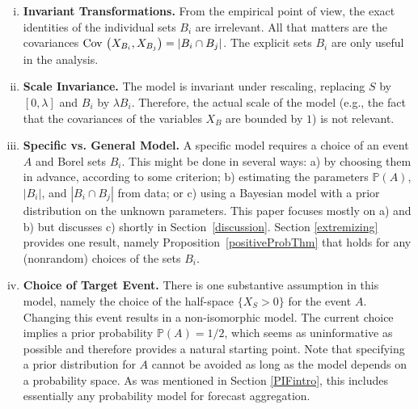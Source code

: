 \documentclass[12pt]{article}
\renewcommand{\P}{\mathbb{P}}
\theoremstyle{definition}
\theoremstyle{definition}
\def\P{{\mathbb P}}
\def\Cov{{\rm Cov}\,}
\begin{document}
\begin{enumerate}[(i)]
\item {\bf Invariant Transformations.}  From the empirical point of
view, the exact identities of the individual sets $B_i$ are
irrelevant.  All that matters are the covariances $\Cov \left(X_{B_i}
, X_{B_j}\right) = |B_i \cap B_j|$.  The explicit sets $B_i$ are only useful in the analysis.

\item {\bf Scale Invariance.} The model is invariant under rescaling,
replacing $S$ by $[0,\lambda]$ and $B_i$ by $\lambda B_i$.  Therefore,
the actual scale of the model (e.g., the fact that the covariances of
the variables $X_B$ are bounded by $1$) is not relevant. \vspace{-0.5em}


\item {\bf Specific vs. General Model.} A specific model requires a
choice of an event $A$ and Borel sets $B_i$.
This might be done in several ways: a) by choosing them in advance,
according to some criterion; b) estimating the parameters $\P(A)$,
$|B_i|$, and $|B_i \cap B_j|$ from data; or c) using a Bayesian model
with a prior distribution on the unknown parameters.  This paper
focuses mostly on a) and b) but discusses c) shortly in
Section~\ref{discussion}.  Section \ref{extremizing} provides one
result, namely Proposition~\ref{positiveProbThm} that holds for any (nonrandom) choices of the sets $B_i$. \vspace{-0.5em}
\label{item:specific}






\item {\bf Choice of Target Event.}  There is one substantive
assumption in this model, namely the choice of the half-space $\{ X_S
> 0 \}$ for the event $A$.  Changing this event results
in a non-isomorphic model. The current choice
implies a prior probability $\P(A) = 1/2$, which seems as
uninformative as possible and therefore provides a natural starting
point. Note that specifying a prior distribution for $A$ cannot be avoided as
long as the model depends on a probability space. As was mentioned in
Section \ref{PIFintro}, this includes essentially any probability
model for forecast aggregation. \vspace{-0.5em}
\label{item:choice}


\end{enumerate}
\end{document}

